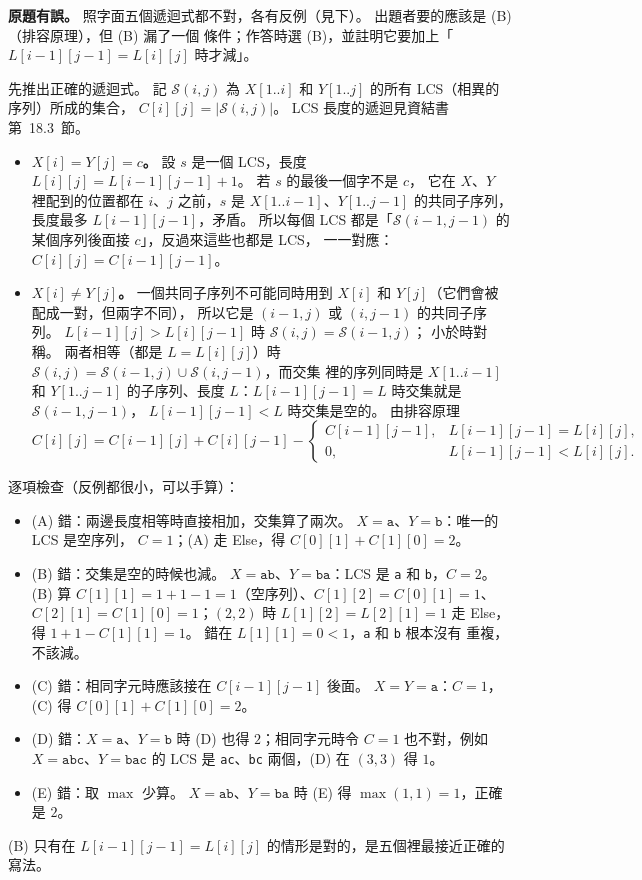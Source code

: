 \begin{pastsoln}
\textbf{原題有誤。} 照字面五個遞迴式都不對，各有反例（見下）。 出題者要的應該是 (B)（排容原理），但 (B) 漏了一個
條件；作答時選 (B)，並註明它要加上「$L[i-1][j-1] = L[i][j]$ 時才減」。

先推出正確的遞迴式。 記 $\mathcal{S}(i, j)$ 為 $X[1..i]$ 和 $Y[1..j]$ 的所有 LCS（相異的序列）所成的集合，
$C[i][j] = |\mathcal{S}(i, j)|$。 LCS 長度的遞迴見資結書第~18.3~節。
\begin{itemize}
\item \textbf{$X[i] = Y[j] = c$。} 設 $s$ 是一個 LCS，長度 $L[i][j] = L[i-1][j-1] + 1$。 若 $s$ 的最後一個字不是 $c$，
它在 $X$、$Y$ 裡配到的位置都在 $i$、$j$ 之前，$s$ 是 $X[1..i-1]$、$Y[1..j-1]$ 的共同子序列，長度最多
$L[i-1][j-1]$，矛盾。 所以每個 LCS 都是「$\mathcal{S}(i-1, j-1)$ 的某個序列後面接 $c$」，反過來這些也都是 LCS，
一一對應：$C[i][j] = C[i-1][j-1]$。
\item \textbf{$X[i] \ne Y[j]$。} 一個共同子序列不可能同時用到 $X[i]$ 和 $Y[j]$（它們會被配成一對，但兩字不同），
所以它是 $(i-1, j)$ 或 $(i, j-1)$ 的共同子序列。 $L[i-1][j] > L[i][j-1]$ 時 $\mathcal{S}(i, j) = \mathcal{S}(i-1, j)$；
小於時對稱。 兩者相等（都是 $L = L[i][j]$）時 $\mathcal{S}(i, j) = \mathcal{S}(i-1, j) \cup \mathcal{S}(i, j-1)$，而交集
裡的序列同時是 $X[1..i-1]$ 和 $Y[1..j-1]$ 的子序列、長度 $L$：$L[i-1][j-1] = L$ 時交集就是 $\mathcal{S}(i-1, j-1)$，
$L[i-1][j-1] < L$ 時交集是空的。 由排容原理
\[
C[i][j] = C[i-1][j] + C[i][j-1] - \begin{cases} C[i-1][j-1], & L[i-1][j-1] = L[i][j], \\ 0, & L[i-1][j-1] < L[i][j]. \end{cases}
\]
\end{itemize}

逐項檢查（反例都很小，可以手算）：
\begin{itemize}
\item (A) 錯：兩邊長度相等時直接相加，交集算了兩次。 $X = \texttt{a}$、$Y = \texttt{b}$：唯一的 LCS 是空序列，
$C = 1$；(A) 走 Else，得 $C[0][1] + C[1][0] = 2$。
\item (B) 錯：交集是空的時候也減。 $X = \texttt{ab}$、$Y = \texttt{ba}$：LCS 是 \texttt{a} 和 \texttt{b}，$C = 2$。
(B) 算 $C[1][1] = 1 + 1 - 1 = 1$（空序列）、$C[1][2] = C[0][1] = 1$、$C[2][1] = C[1][0] = 1$；$(2, 2)$ 時
$L[1][2] = L[2][1] = 1$ 走 Else，得 $1 + 1 - C[1][1] = 1$。 錯在 $L[1][1] = 0 < 1$，\texttt{a} 和 \texttt{b} 根本沒有
重複，不該減。
\item (C) 錯：相同字元時應該接在 $C[i-1][j-1]$ 後面。 $X = Y = \texttt{a}$：$C = 1$，(C) 得 $C[0][1] + C[1][0] = 2$。
\item (D) 錯：$X = \texttt{a}$、$Y = \texttt{b}$ 時 (D) 也得 $2$；相同字元時令 $C = 1$ 也不對，例如
$X = \texttt{abc}$、$Y = \texttt{bac}$ 的 LCS 是 \texttt{ac}、\texttt{bc} 兩個，(D) 在 $(3, 3)$ 得 $1$。
\item (E) 錯：取 $\max$ 少算。 $X = \texttt{ab}$、$Y = \texttt{ba}$ 時 (E) 得 $\max(1, 1) = 1$，正確是 $2$。
\end{itemize}
(B) 只有在 $L[i-1][j-1] = L[i][j]$ 的情形是對的，是五個裡最接近正確的寫法。
\end{pastsoln}
